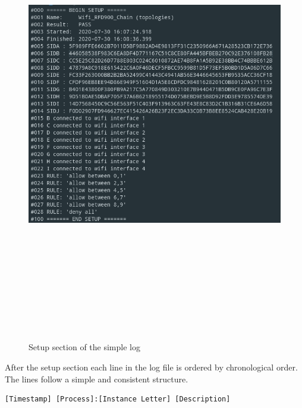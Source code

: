 \begin{figure}
    \begin{centering}
        \includegraphics[width=15cm,height=20cm,keepaspectratio]{Figures/Chapter5-SimpleLogSetup.png}
        \caption{Setup section of the simple log}
        \label{fig:chapter5SimpleLogSetup}
    \end{centering}
\end{figure}
After the setup section each line in the log file is ordered by chronological order. 
The lines follow a simple and consistent structure.
\begin{center}
    \begin{lstlisting}[breaklines]
[Timestamp] [Process]:[Instance Letter] [Description]
    \end{lstlisting}
\end{center}
